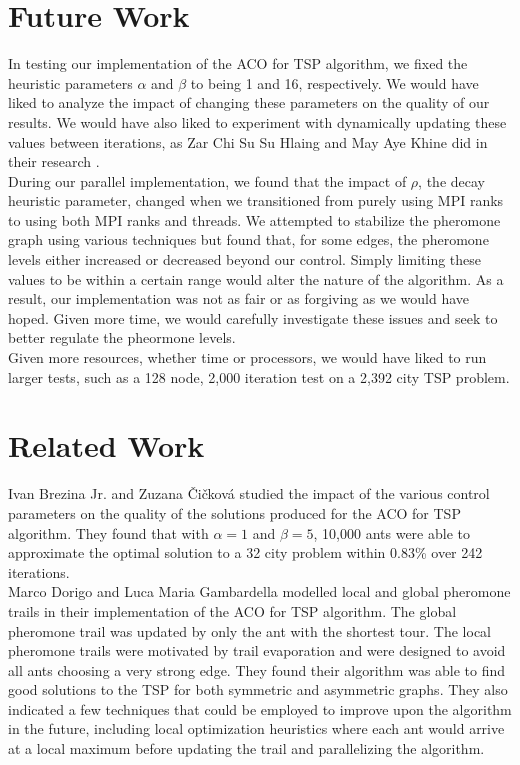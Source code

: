 \documentclass[twocolumn]{article}
\begin{document}
\section{Future Work}

In testing our implementation of the ACO for TSP algorithm, we fixed the 
heuristic parameters $\alpha$ and $\beta$ to being 1 and 16, respectively. We 
would have liked to analyze the impact of changing these parameters on the
quality of our results. We would have also liked to experiment with dynamically
updating these values between iterations, as Zar Chi Su Su Hlaing and May Aye 
Khine did in their research \cite{ipcsit:aco}. \\

During our parallel implementation, we found that the impact of $\rho$, the 
decay heuristic parameter, changed when we transitioned from purely using MPI
ranks to using both MPI ranks and threads. We attempted to stabilize the 
pheromone graph using various techniques but found that, for some edges, the
pheromone levels either increased or decreased beyond our control. Simply 
limiting these values to be within a certain range would alter the nature of the
algorithm. As a result, our implementation was not as fair or as forgiving as we
would have hoped. Given more time, we would carefully investigate these issues
and seek to better regulate the pheormone levels. \\

Given more resources, whether time or processors, we would have liked to run 
larger tests, such as a 128 node, 2,000 iteration test on a 2,392 city TSP 
problem. 

\section{Related Work}

Ivan Brezina Jr. and Zuzana \v{C}i\v{c}kov\'{a} \cite{mis:aco} studied the 
impact of the various control parameters on the quality of the solutions 
produced for the ACO for TSP algorithm. They found that with $\alpha=1$ and 
$\beta=5$, 10,000 ants were able to approximate the optimal solution to a 32 city
problem within 0.83\% over 242 iterations. \\

Marco Dorigo and Luca Maria Gambardella \cite{iridia:aco} modelled local and 
global pheromone trails in their implementation of the ACO for TSP algorithm. 
The global pheromone trail was updated by only the ant with the shortest tour. 
The local pheromone trails were motivated by trail evaporation and were designed
to avoid all ants choosing a very strong edge. They found their algorithm was 
able to find good solutions to the TSP for both symmetric and asymmetric graphs.
They also indicated a few techniques that could be employed to improve upon the 
algorithm in the future, including local optimization heuristics where each ant 
would arrive at a local maximum before updating the trail and parallelizing the
algorithm. \\
\end{document}
